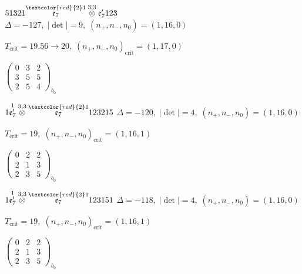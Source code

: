\documentclass[10pt]{article}
\begin{document}
\smallskip

$51321\overset{\textcolor{red}{2}1}{\mathfrak{e}_7}\overset{3,3}{\otimes}\mathfrak{e}_7'123$ \quad $\Delta=-127,\; |\det|=9,\; (n_+,n_-,n_0)=(1,16,0)$

\hspace{1em}$T_{\text{crit}}=19.56 \to 20,\; (n_+,n_-,n_0)_{\text{crit}}=(1,17,0)$

\hspace{2em}$\left(\begin{smallmatrix}0 & 3 & 2 \\ 3 & 5 & 5 \\ 2 & 5 & 4\end{smallmatrix}\right)_{\!b_0}$

\smallskip

$1\overset{1}{\mathfrak{e}_7'}\overset{3,3}{\otimes}\overset{\textcolor{red}{2}1}{\mathfrak{e}_7}123215$ \quad $\Delta=-120,\; |\det|=4,\; (n_+,n_-,n_0)=(1,16,0)$

\hspace{1em}$T_{\text{crit}}=19,\; (n_+,n_-,n_0)_{\text{crit}}=(1,16,1)$

\hspace{2em}$\left(\begin{smallmatrix}0 & 2 & 2 \\ 2 & 1 & 3 \\ 2 & 3 & 5\end{smallmatrix}\right)_{\!b_0}$

\smallskip

$1\overset{1}{\mathfrak{e}_7'}\overset{3,3}{\otimes}\overset{\textcolor{red}{2}1}{\mathfrak{e}_7}123151$ \quad $\Delta=-118,\; |\det|=4,\; (n_+,n_-,n_0)=(1,16,0)$

\hspace{1em}$T_{\text{crit}}=19,\; (n_+,n_-,n_0)_{\text{crit}}=(1,16,1)$

\hspace{2em}$\left(\begin{smallmatrix}0 & 2 & 2 \\ 2 & 1 & 3 \\ 2 & 3 & 5\end{smallmatrix}\right)_{\!b_0}$
\end{document}

